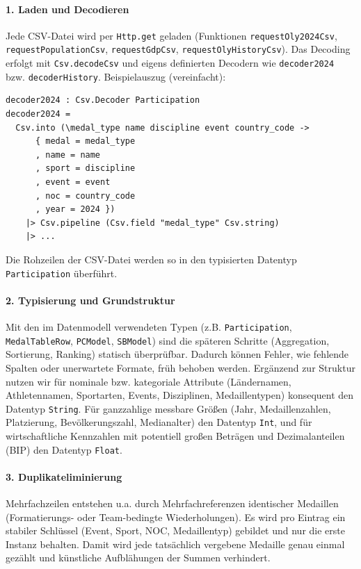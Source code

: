 \paragraph{1. Laden und Decodieren}
Jede CSV-Datei wird per \texttt{Http.get} geladen (Funktionen \texttt{requestOly2024Csv}, \texttt{requestPopulationCsv}, \texttt{requestGdpCsv}, \texttt{requestOlyHistoryCsv}). Das Decoding erfolgt mit \texttt{Csv.decodeCsv} und eigens definierten Decodern wie \texttt{decoder2024} bzw. \texttt{decoderHistory}. Beispielauszug (vereinfacht):
\begin{verbatim}
decoder2024 : Csv.Decoder Participation
decoder2024 =
  Csv.into (\medal_type name discipline event country_code ->
      { medal = medal_type
      , name = name
      , sport = discipline
      , event = event
      , noc = country_code
      , year = 2024 })
    |> Csv.pipeline (Csv.field "medal_type" Csv.string)
    |> ...
\end{verbatim}
Die Rohzeilen der CSV-Datei werden so in den typisierten Datentyp \texttt{Participation} überführt.

\paragraph{2. Typisierung und Grundstruktur}
Mit den im Datenmodell verwendeten Typen (z.B. \texttt{Participation}, \texttt{MedalTableRow},
\texttt{PCModel}, \texttt{SBModel}) sind die späteren Schritte (Aggregation, Sortierung, Ranking) statisch überprüfbar. Dadurch können Fehler, wie fehlende Spalten oder unerwartete Formate, früh behoben werden. Ergänzend zur Struktur nutzen wir für nominale bzw. kategoriale Attribute (Ländernamen, Athletennamen, Sportarten, Events, Disziplinen, Medaillentypen) konsequent den Datentyp \texttt{String}. Für ganzzahlige messbare Größen (Jahr, Medaillenzahlen, Platzierung, Bevölkerungszahl, Medianalter) den Datentyp \texttt{Int}, und für wirtschaftliche Kennzahlen mit potentiell großen Beträgen und Dezimalanteilen (BIP) den Datentyp \texttt{Float}.

\paragraph{3. Duplikateliminierung}
Mehrfachzeilen entstehen u.a. durch Mehrfachreferenzen identischer Medaillen (Formatierungs- oder Team-bedingte Wiederholungen). Es wird pro Eintrag ein stabiler Schlüssel (Event, Sport, NOC, Medaillentyp) gebildet und nur die erste Instanz behalten. Damit wird jede tatsächlich vergebene Medaille genau einmal gezählt und künstliche Aufblähungen der Summen verhindert.

